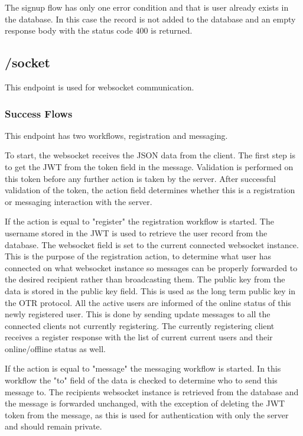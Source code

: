 The signup flow has only one error condition and that is user already exists in the database. In this case the record is not added to the database and an empty response body with the status code 400 is returned.


\subsection{/socket}


This endpoint is used for websocket communication.


\subsubsection{Success Flows}


This endpoint has two workflows, registration and messaging.


To start, the websocket receives the JSON data from the client. The first step is to get the JWT from the token field in the message. Validation is performed on this token before any further action is taken by the server. After successful validation of the token, the action field determines whether this is a registration or messaging interaction with the server.


If the action is equal to "register" the registration workflow is started. The username stored in the JWT is used to retrieve the user record from the database. The websocket field is set to the current connected websocket instance. This is the purpose of the registration action, to determine what user has connected on what websocket instance so messages can be properly forwarded to the desired recipient rather than broadcasting them. The public key from the data is stored in the public key field. This is used as the long term public key in the OTR protocol. All the active users are informed of the online status of this newly registered user. This is done by sending update messages to all the connected clients not currently registering. The currently registering client receives a register response with the list of current current users and their online/offline status as well.


If the action is equal to "message" the messaging workflow is started. In this workflow the "to" field of the data is checked to determine who to send this message to. The recipients websocket instance is retrieved from the database and the message is forwarded unchanged, with the exception of deleting the JWT token from the message, as this is used for authentication with only the server and should remain private.


